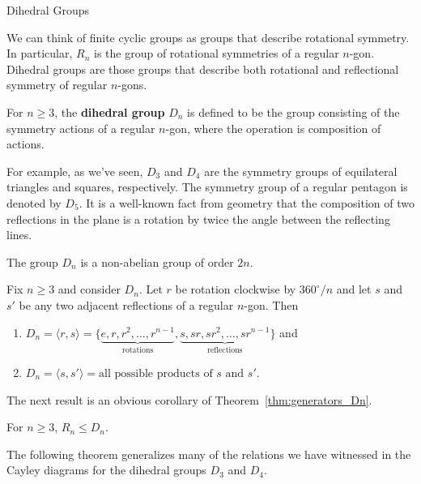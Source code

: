 \begin{section}{Dihedral Groups}

We can think of finite cyclic groups as groups that describe rotational symmetry.  In particular, $R_n$ is the group of rotational symmetries of a regular $n$-gon.  Dihedral groups are those groups that describe both rotational and reflectional symmetry of regular $n$-gons.

\begin{definition}\label{def:dihedral}
For $n\geq 3$, the \textbf{dihedral group} $D_n$ is defined to be the group consisting of the symmetry actions of a regular $n$-gon, where the operation is composition of actions.
\end{definition}

For example, as we've seen, $D_3$ and $D_4$ are the symmetry groups of equilateral triangles and squares, respectively.  The symmetry group of a regular pentagon is denoted by $D_5$.  It is a well-known fact from geometry that the composition of two reflections in the plane is a rotation by twice the angle between the reflecting lines.

\begin{theorem}
The group $D_n$ is a non-abelian group of order $2n$.
\end{theorem}

\begin{theorem}\label{thm:generators_Dn}
Fix $n\geq 3$ and consider $D_n$. Let $r$ be rotation clockwise by $360^{\circ}/n$  and let $s$ and $s'$ be any two adjacent reflections of a regular $n$-gon.  Then
\begin{enumerate}[label=\textrm{(\alph*)}]
\item $D_n=\langle r,s\rangle =\{\underbrace{e,r,r^2,\ldots, r^{n-1}}_{\text{rotations}},\underbrace{s,sr,sr^2,\ldots,sr^{n-1}}_{\text{reflections}}\}$ and
\item $D_n=\langle s,s'\rangle = \text{all possible products of }s\text{ and }s'$.
\end{enumerate}
\end{theorem}

The next result is an obvious corollary of Theorem~\ref{thm:generators_Dn}.

\begin{corollary}
For $n\geq 3$, $R_n\leq D_n$.
\end{corollary}

The following theorem generalizes many of the relations we have witnessed in the Cayley diagrams for the dihedral groups $D_3$ and $D_4$.


\end{section}
